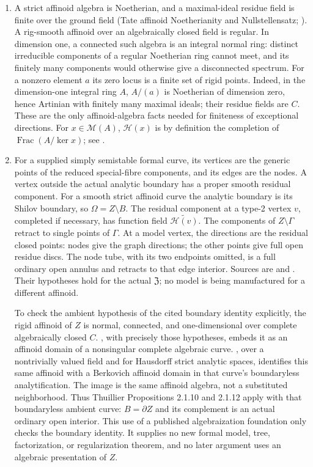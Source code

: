 \documentclass[11pt]{article}
\begin{document}
\begin{enumerate}
\item A strict affinoid algebra is Noetherian, and a maximal-ideal
residue field is finite over the ground field (Tate affinoid
Noetherianity and Nullstellensatz; \cite[\S6.1.2]{BGR}). A rig-smooth
affinoid over an algebraically closed field is regular. In dimension
one, a connected such algebra is an integral normal ring: distinct
irreducible components of a regular Noetherian ring cannot meet, and
its finitely many components would otherwise give a disconnected
spectrum. For a nonzero element $a$ its zero locus is a finite set of
rigid points. Indeed, in the dimension-one integral ring $A$, $A/(a)$
is Noetherian of dimension zero, hence Artinian with finitely many
maximal ideals; their residue fields are $C$. These are the only
affinoid-algebra facts needed for finiteness of exceptional directions.
For $x\in\mathcal{M}(A)$, $\mathcal{H}(x)$ is by definition the completion
of $\operatorname{Frac}(A/\ker x)$; see
\cite[\S2.1.1, immediately before Proposition 2.1.1]{Thu}.

\item For a supplied simply semistable formal curve, its vertices are
the generic points of the reduced special-fibre components, and its
edges are the nodes. A vertex outside the actual analytic boundary has
a proper smooth residual component. For a smooth strict affinoid curve
the analytic boundary is its Shilov boundary, so $\Omega=Z\setminus B$.
The residual component at a type-2 vertex $v$, completed if necessary,
has function field $\widetilde{\mathcal{H}(v)}$.
The components of $Z\setminus\Gamma$ retract to single points of
$\Gamma$. At a model vertex, the directions are the residual closed
points: nodes give the graph directions; the other points give full
open residue discs. The node tube, with its two endpoints omitted,
is a full ordinary open annulus and retracts to that edge interior.
Sources are \cite[Proposition 2.1.2, Proposition 2.1.12,
\S2.2.2--2.2.3, and the proper-component criterion in the proof of
Proposition 2.2.24]{Thu} and \cite[15.2]{GJR}.
Their hypotheses hold for the actual $\mathfrak Z$; no model is being
manufactured for a different affinoid.

To check the ambient hypothesis of the cited boundary identity
explicitly, the rigid affinoid of $Z$ is normal, connected, and
one-dimensional over complete algebraically closed $C$.
\cite[Theorem 1.1]{VdP}, with precisely those hypotheses, embeds
it as an affinoid domain of a nonsingular complete algebraic curve.
\cite[Theorem 1.6.1 and Lemma 1.6.2(i)]{Ber}, over a nontrivially
valued field and for Hausdorff strict analytic spaces, identifies
this same affinoid with a Berkovich affinoid domain in that curve's
boundaryless analytification. The image is the same affinoid
algebra, not a substituted neighborhood. Thus Thuillier
Propositions 2.1.10 and 2.1.12 apply with that boundaryless ambient
curve: $B=\partial Z$ and its complement is an actual ordinary
open interior. This use of a published algebraization foundation
only checks the boundary identity. It supplies no new formal model,
tree, factorization, or regularization theorem, and no later
argument uses an algebraic presentation of $Z$.


\end{enumerate}
\end{document}
